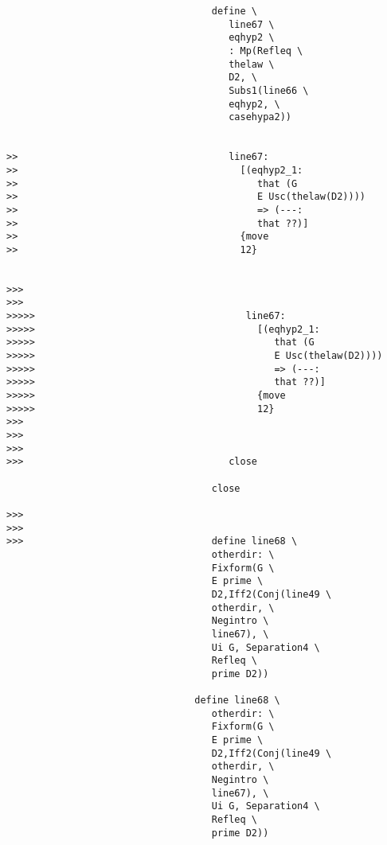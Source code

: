 \documentclass[12pt]{article}
\begin{document}
\begin{verbatim}
                                    define \
                                       line67 \
                                       eqhyp2 \
                                       : Mp(Refleq \
                                       thelaw \
                                       D2, \
                                       Subs1(line66 \
                                       eqhyp2, \
                                       casehypa2))


>>                                     line67:
>>                                       [(eqhyp2_1:
>>                                          that (G
>>                                          E Usc(thelaw(D2))))
>>                                          => (---:
>>                                          that ??)]
>>                                       {move
>>                                       12}


>>>
>>>
>>>>>                                     line67:
>>>>>                                       [(eqhyp2_1:
>>>>>                                          that (G
>>>>>                                          E Usc(thelaw(D2))))
>>>>>                                          => (---:
>>>>>                                          that ??)]
>>>>>                                       {move
>>>>>                                       12}
>>>
>>>
>>>
>>>                                    close

                                    close

>>>
>>>
>>>                                 define line68 \
                                    otherdir: \
                                    Fixform(G \
                                    E prime \
                                    D2,Iff2(Conj(line49 \
                                    otherdir, \
                                    Negintro \
                                    line67), \
                                    Ui G, Separation4 \
                                    Refleq \
                                    prime D2))

                                 define line68 \
                                    otherdir: \
                                    Fixform(G \
                                    E prime \
                                    D2,Iff2(Conj(line49 \
                                    otherdir, \
                                    Negintro \
                                    line67), \
                                    Ui G, Separation4 \
                                    Refleq \
                                    prime D2))



\end{verbatim}
\end{document}
